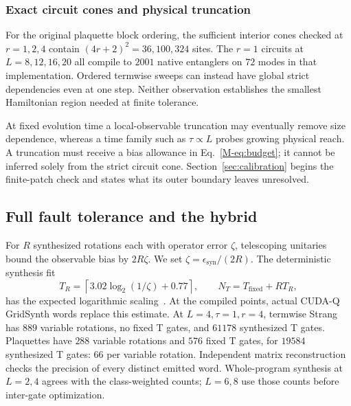 \documentclass[11pt]{article}
\newcommand{\eps}{\epsilon}
\begin{document}
\subsubsection{Exact circuit cones and physical truncation}
For the original plaquette block ordering, the sufficient interior cones
checked at $r=1,2,4$ contain $(4r+2)^2=36,100,324$ sites. The $r=1$
circuits at $L=8,12,16,20$ all compile to $2001$ native entanglers on $72$
modes in that implementation. Ordered termwise sweeps can instead have
global strict dependencies even at one step. Neither observation establishes
the smallest Hamiltonian region needed at finite tolerance.

At fixed evolution time a local-observable truncation may eventually remove
size dependence, whereas a time family such as $\tau\propto L$ probes
growing physical reach. A truncation must receive a bias allowance in
Eq.~\eqref{M-eq:budget}; it cannot be inferred solely from the strict circuit
cone. Section~\ref{sec:calibration} begins the finite-patch check and states
what its outer boundary leaves unresolved.


\subsection{Full fault tolerance and the hybrid}
For $R$ synthesized rotations each with operator error $\zeta$, telescoping
unitaries bound the observable bias by $2R\zeta$. We set
$\zeta=\eps_{\mathrm{syn}}/(2R)$. The deterministic synthesis fit
\begin{equation}
 T_R=\left\lceil3.02\log_2(1/\zeta)+0.77\right\rceil,\qquad
 N_T=T_{\mathrm{fixed}}+RT_R,
\end{equation}
has the expected logarithmic scaling~\cite{ross}. At the compiled points,
actual CUDA-Q GridSynth words replace this estimate. At $L=4,\tau=1,r=4$, termwise Strang has $889$ variable rotations,
no fixed T gates, and $61178$ synthesized T gates. Plaquettes have $288$
variable rotations and $576$ fixed T gates, for $19584$ synthesized T gates:
$66$ per variable rotation. Independent matrix reconstruction checks the
precision of every distinct emitted word. Whole-program synthesis at
$L=2,4$ agrees with the class-weighted counts; $L=6,8$ use those counts
before inter-gate optimization.
\end{document}
